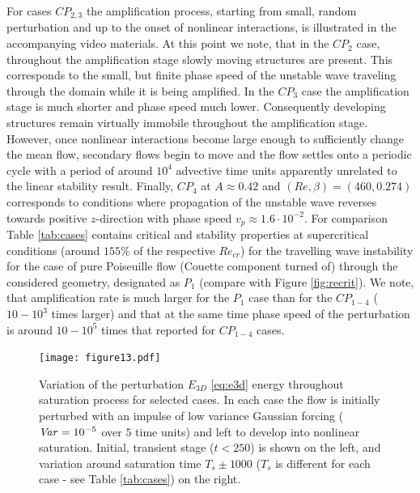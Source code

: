 \documentclass[lineno]{jfm}
\DeclareMathOperator{\Var}{\it Var}
\begin{document}
For cases $CP_{2,3}$ the amplification process, starting from small, random perturbation and up to the onset of nonlinear interactions, is illustrated in the accompanying video materials.
At this point we note, that in the $CP_2$ case, throughout the amplification stage slowly moving structures are present. This corresponds to the small, but finite phase speed of  the unstable wave traveling through the domain while it is being amplified.
In the $CP_3$ case the amplification stage is much shorter and phase speed   much lower.
Consequently developing structures remain virtually immobile throughout the amplification stage.
However, once nonlinear interactions become large enough to sufficiently change the mean flow, secondary flows begin to move and the flow settles onto a periodic cycle with a period of around $10^4$ advective time units\deleted{,}  apparently unrelated to the linear stability result.
Finally, $CP_4$ at $A\approx0.42$ and $(Re, \beta)=(460, 0.274)$ corresponds to conditions where propagation of the unstable wave reverses towards positive $z$-direction with phase speed  $v_p\approx1.6\cdot10^{-2}$.
For comparison Table \ref{tab:cases} contains critical and stability properties at supercritical conditions (around $155\%$ of the respective $Re_{cr}$) for the travelling wave instability for the case of pure Poiseuille flow (Couette component turned of) through the considered geometry, designated as $P_1$ (compare with Figure \ref{fig:recrit}).
We note, that amplification rate is much larger for the $P_1$ case than for the $CP_{1-4}$ ($10-10^3$ times larger)
and that
at the same time phase speed of the perturbation is around $10-10^5$ times that reported for $CP_{1-4}$ cases.

\begin{figure}
\centering
	\texttt{[image: figure13.pdf]}
	\caption{Variation of the perturbation $E_{3D}$ \eqref{eq:e3d} energy throughout saturation process for selected cases. In each case the flow is initially perturbed with an impulse of low variance Gaussian  forcing (${\Var}=10^{-5}$ over $5$ time units) and left to develop into nonlinear saturation. Initial, transient stage ($t<250$) is shown on the left, and variation around saturation time $T_s\pm1000$ ($T_s$ is different for each case - see Table \ref{tab:cases}) on the right.}
	\label{fig:tstar}
\end{figure}
\end{document}
